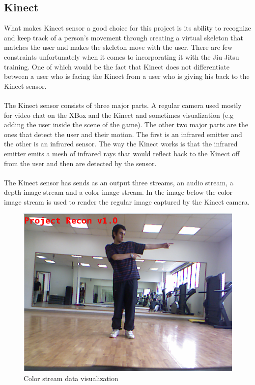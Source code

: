 \subsection{Kinect}
What makes Kinect sensor a good choice for this project is its ability to recognize and keep track of a person's movement through creating a virtual skeleton that matches the user and makes the skeleton move with the user. There are few constraints unfortunately when it comes to incorporating it with the Jiu Jitsu training. One of which would be the fact that Kinect does not differentiate between a user who is facing the Kinect from a user who is giving his back to the Kinect sensor.
\\
\\
The Kinect sensor consists of three major parts. A regular camera used mostly for video chat on the XBox and the Kinect and sometimes visualization (e.g adding the user inside the scene of the game). The other two major parts are the ones that detect the user and their motion. The first is an infrared emitter and the other is an infrared sensor. The way the Kinect works is that the infrared emitter emits a mesh of infrared rays that would reflect back to the Kinect off from the user and then are detected by the sensor.
\\
\\
The Kinect sensor has sends as an output three streams, an audio stream, a depth image stream and a color image stream. In the image below the color image stream is used to render the regular image captured by the Kinect camera.
\\
\begin{figure}[ht]
\centering
\includegraphics[scale=1]{images/color_data.png}
\caption{Color stream data visualization}
\label{4.3}
\end{figure}
